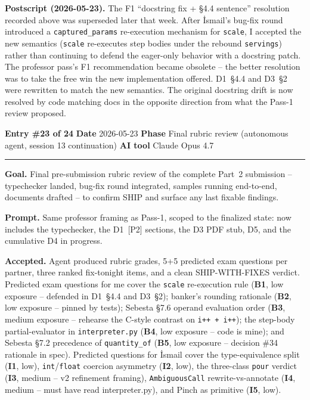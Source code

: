 \documentclass[11pt,a4paper]{article}
\newcommand{\entryheader}[4]{%
    \par\vspace{1em}\noindent\textbf{Entry \#{#1}} \textbullet{} \textbf{Date} #2 \textbullet{} \textbf{Phase} #3 \textbullet{} \textbf{AI tool} #4 \par\vspace{0.3em}\noindent\rule{\textwidth}{0.4pt}\par\vspace{0.3em}}
\newcommand{\field}[1]{\noindent\textbf{#1}}
\begin{document}
\begin{tcolorbox}[colback=ackcolor!8,colframe=ackcolor!50,boxrule=0.5pt]
\small\textbf{Postscript (2026-05-23).} The F1 ``docstring fix + \S4.4
sentence'' resolution recorded above was superseded later that week.
After İsmail's bug-fix round introduced a \texttt{captured\_params}
re-execution mechanism for \texttt{scale}, I accepted the new
semantics (\texttt{scale} re-executes step bodies under the rebound
\texttt{servings}) rather than continuing to defend the eager-only
behavior with a docstring patch. The professor pass's F1 recommendation
became obsolete -- the better resolution was to take the free win the
new implementation offered. D1~\S4.4 and D3~\S2 were rewritten to
match the new semantics. The original docstring drift is now resolved
by code matching docs in the opposite direction from what the Pass-1
review proposed.
\end{tcolorbox}

\entryheader{23 of 24}{2026-05-23}{Final rubric review (autonomous agent, session 13 continuation)}{Claude Opus 4.7}

\field{Goal.} Final pre-submission rubric review of the complete Part~2
submission -- typechecker landed, bug-fix round integrated, samples
running end-to-end, documents drafted -- to confirm SHIP and surface
any last fixable findings.

\field{Prompt.} Same professor framing as Pass-1, scoped to the
finalized state: now includes the typechecker, the D1~[P2] sections,
the D3 PDF stub, D5, and the cumulative D4 in progress.

\field{Accepted.} Agent produced rubric grades, 5+5 predicted exam
questions per partner, three ranked fix-tonight items, and a clean
SHIP-WITH-FIXES verdict. Predicted exam questions for me cover the
\texttt{scale} re-execution rule (\textbf{B1}, low exposure -- defended
in D1~\S4.4 and D3~\S2); banker's rounding rationale (\textbf{B2}, low
exposure -- pinned by tests); Sebesta \S7.6 operand evaluation order
(\textbf{B3}, medium exposure -- rehearse the C-style contrast on
\texttt{i++ + i++}); the step-body partial-evaluator in
\texttt{interpreter.py} (\textbf{B4}, low exposure -- code is mine);
and Sebesta \S7.2 precedence of \texttt{quantity\_of} (\textbf{B5}, low
exposure -- decision \#34 rationale in spec). Predicted questions for
İsmail cover the type-equivalence split (\textbf{I1}, low),
\texttt{int}/\texttt{float} coercion asymmetry (\textbf{I2}, low),
the three-class \texttt{pour} verdict (\textbf{I3}, medium -- v2
refinement framing), \texttt{AmbiguousCall} rewrite-vs-annotate
(\textbf{I4}, medium -- must have read interpreter.py), and Pinch as
primitive (\textbf{I5}, low).
\end{document}
